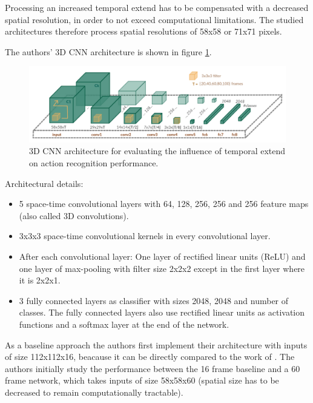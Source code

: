 Processing an increased temporal extend has to be compensated with a decreased spatial resolution, in order to not exceed computational limitations.
The studied architectures therefore process spatial resolutions of 58x58 or 71x71 pixels.

The authors' 3D CNN architecture is shown in figure \ref{fig:longterm_architecture}.

\begin{figure}[H]
    \centering
    \includegraphics[width=\textwidth]{img_deep/longterm_architecture}
    \caption{3D CNN architecture for evaluating the influence of temporal extend on action recognition performance. \cite{varol_long-term_2016}}
    \label{fig:longterm_architecture}
\end{figure}

Architectural details:

\begin{itemize}
    \item 5 space-time convolutional layers with 64, 128, 256, 256 and 256 feature maps (also called 3D convolutions).
    \item 3x3x3 space-time convolutional kernels in every convolutional layer.
    \item After each convolutional layer: One layer of rectified linear units (ReLU) and one layer of max-pooling with filter size 2x2x2 except in the first layer where it is 2x2x1.
    \item 3 fully connected layers as classifier with sizes 2048, 2048 and number of classes.
        The fully connected layers also use rectified linear units as activation functions and a softmax layer at the end of the network.
\end{itemize}

As a baseline approach the authors first implement their architecture with inputs of size 112x112x16, beacause it can be directly compared to the work of \textcite{tran_learning_2015}.
The authors initially study the performance between the 16 frame baseline and a 60 frame network, which takes inputs of size 58x58x60 (spatial size has to be decreased to remain computationally tractable).

